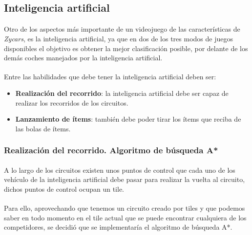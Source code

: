 \documentclass[a4paper,11pt]{article} %
\begin{document}
\subsection{Inteligencia artificial}

\paragraph{}
Otro de los aspectos más importante de un videojuego de las características de \emph{Zycars}, es la inteligencia artificial,
ya que en dos de los tres modos de juegos disponibles el objetivo es obtener la mejor clasificación posible, por delante
de los demás coches manejados por la inteligencia artificial.

\paragraph{}
Entre las habilidades que debe tener la inteligencia artificial deben ser:

\begin{itemize}
    \item \textbf{Realización del recorrido}: la inteligencia artificial debe ser capaz de realizar los recorridos de los
    circuitos.
    
    \item \textbf{Lanzamiento de ítems}: también debe poder tirar los ítems que
    reciba de las bolas de ítems.
\end{itemize}

\subsubsection{Realización del recorrido. Algoritmo de búsqueda A*}

\paragraph{}
A lo largo de los circuitos existen unos puntos de control que cada uno de los vehículo de la inteligencia artificial
debe pasar para realizar la vuelta al circuito, dichos puntos de control ocupan un tile.

\paragraph{}
Para ello, aprovechando que tenemos un circuito creado por tiles y que podemos
saber en todo momento en el tile actual
que se puede encontrar cualquiera de los competidores, se decidió que se implementaría el algoritmo de búsqueda A*.
\end{document}

